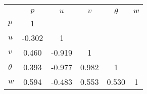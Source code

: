 \begin{tabular}{l*{5}{c}}
\toprule
                &\multicolumn{5}{c}{}                             \\
                &    $ p $&    $ u $&    $ v $&$ \theta $&    $ w $\\
\midrule
$ p $           &        1&         &         &         &         \\
$ u $           &   -0.302&        1&         &         &         \\
$ v $           &    0.460&   -0.919&        1&         &         \\
$ \theta $      &    0.393&   -0.977&    0.982&        1&         \\
$ w $           &    0.594&   -0.483&    0.553&    0.530&        1\\
\bottomrule
\end{tabular}
